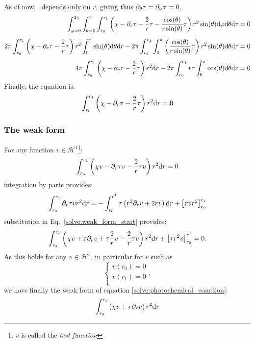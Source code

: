 %
As of now, \transport\ depends only on $r$, giving thus 
$\partial_{\theta}{\tau} = \partial_{\varphi}{\tau} = 0$.
%
\begin{equation}
\begin{split}
\int_{\varphi = 0}^{2\pi}\int_{\theta = 0}^{\pi}\int_{r_0}^{r_1}
\left( \chi - \partial_{r}{\tau} - \frac{2}{r}\tau - \frac{\cos(\theta)}{r\sin(\theta)}\tau 
\right) 
r^2\sin(\theta)\mathrm{d}\varphi\mathrm{d}\theta\mathrm{d} r
 & = 0 \\[5pt]
2\pi\int_{r_0}^{r_1}
\left(
\chi - \partial_{r}{\tau} - \frac{2}{r}\tau
\right)
r^2
\int_{0}^{\pi}\sin(\theta)\mathrm{d}\theta\mathrm{d} r
 - 
2\pi\int_{r_0}^{r_1}\int_{0}^{\pi}
\left(
\frac{\cos(\theta)}{r\sin(\theta)}\tau  \right)
r^2\sin(\theta)\mathrm{d}\theta\mathrm{d} r
 & = 0 \\[5pt]
4\pi\int_{r_0}^{r_1}\left(
\chi - \partial_{r}{\tau} - \frac{2}{r}\tau
\right)
r^2\mathrm{d} r
-
2\pi\int_{r_0}^{r_1} r\tau \int_{0}^{\pi}
\cos(\theta)\mathrm{d}\theta\mathrm{d} r
 & = 0
\end{split}
\end{equation}
%
Finally, the equation is:
\begin{equation}
\int_{r_0}^{r_1}\left(\chi - \partial_{r}{\tau} - \frac{2}{r}\tau\right)r^2\mathrm{d} r = 0
\label{solve:photochemical_equation}
\end{equation}

\subsubsection{The weak form}

For any function $v \in \mathcal{H}^1$\footnote{$v$ is called the \emph{test function}}:
\begin{equation}
\int_{r_0}^{r_1}\left(\chi v - \partial_{r}{\tau} v - \frac{2}{r}\tau v \right)r^2\mathrm{d} r = 0
\label{solve:weak_form_start}
\end{equation}
%
integration by parts provides:
\begin{equation}
\int_{r_0}^{r_1}\partial_{r}{\tau} v r^2 \mathrm{d} r = - \int_{r_0}^{r^1} \tau \left(r^2\partial_{r}{v} + 2 r v\right)\mathrm{d} r
                                                    + \left[\tau v r^2\right]_{r_0}^{r_1}
\end{equation}
%
substitution in Eq.~\ref{solve:weak_form_start} provides:
\begin{equation}
\int_{r_0}^{r_1}\left(\chi v + \tau\partial_{r}{v} + \tau\frac{2}{r} v  - \frac{2}{r}\tau v \right)r^2\mathrm{d} r
 + \left[\tau r^2 v\right]_{r_0}^{r^1} = 0.
\end{equation}
%
As this holds for any $v \in \mathcal{H}^1$, in particular for $v$ such as
\[
\left\{\begin{array}{l}
         v(r_0) = 0 \\
         v(r_1) = 0 \\
        \end{array}\right.,
\]
%
we have finally the weak form of equation \ref{solve:photochemical_equation}:
\begin{equation}
\int_{r_0}^{r_1}\left(\chi v + \tau\partial_{r}{v} \right)r^2\mathrm{d} r
\end{equation}

